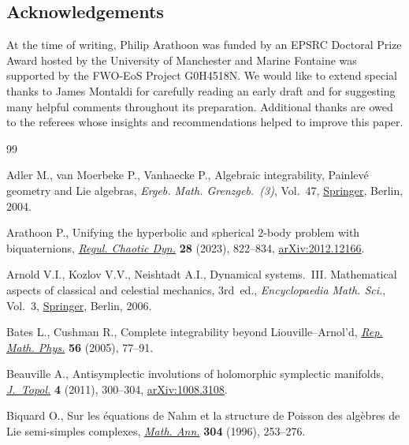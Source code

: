 \documentclass[pdftex]{sigma}
\numberwithin{equation}{section}
\begin{document}
\subsection*{Acknowledgements}
At the time of writing, Philip Arathoon was funded by an EPSRC Doctoral Prize Award hosted by the University of Manchester and Marine Fontaine was supported by the FWO-EoS Project G0H4518N.
We would like to extend special thanks to James Montaldi for carefully reading an early draft and for suggesting many helpful comments throughout its preparation. Additional thanks are owed to the referees whose insights and recommendations helped to improve this paper.

\begin{thebibliography}{99}
\footnotesize\itemsep=0pt

Adler M., van Moerbeke P., Vanhaecke P., Algebraic integrability, {P}ainlev\'e
 geometry and {L}ie algebras, \textit{Ergeb. Math. Grenzgeb.~(3)}, Vol.~47,
 \href{https://doi.org/10.1007/978-3-662-05650-9}{Springer}, Berlin, 2004.

Arathoon P., Unifying the hyperbolic and spherical {$2$}-body problem with
 biquaternions, \href{https://doi.org/10.1134/S1560354723060011}{\textit{Regul. Chaotic Dyn.}} \textbf{28} (2023), 822--834,
 \href{https://arxiv.org/abs/2012.12166}{arXiv:2012.12166}.

Arnold V.I., Kozlov V.V., Neishtadt A.I., Dynamical systems.~III. Mathematical
 aspects of classical and celestial mechanics, 3rd~ed., \textit{Encyclopaedia Math.
 Sci.}, Vol.~3, \href{https://doi.org/10.1007/978-3-540-48926-9}{Springer}, Berlin, 2006.

Bates L., Cushman R., Complete integrability beyond {L}iouville--{A}rnol'd,
 \href{https://doi.org/10.1016/S0034-4877(05)80042-4}{\textit{Rep. Math. Phys.}} \textbf{56} (2005), 77--91.

Beauville A., Antisymplectic involutions of holomorphic symplectic manifolds,
 \href{https://doi.org/10.1112/jtopol/jtr002}{\textit{J.~Topol.}} \textbf{4} (2011), 300--304, \href{https://arxiv.org/abs/1008.3108}{arXiv:1008.3108}.

Biquard O., Sur les \'equations de {N}ahm et la structure de {P}oisson des
 alg\`ebres de {L}ie semi-simples complexes, \href{https://doi.org/10.1007/BF01446293}{\textit{Math. Ann.}} \textbf{304}
 (1996), 253--276.


\end{thebibliography}
\end{document}
